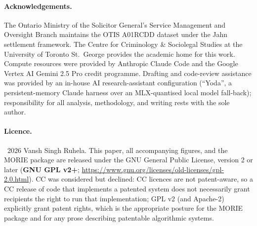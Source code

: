 \documentclass[11pt,a4paper]{article}
\newcommand{\1}{\mathbf{1}}
\theoremstyle{plain}
\theoremstyle{definition}
\begin{document}
\paragraph{Acknowledgements.}
The Ontario Ministry of the Solicitor General's Service Management
and Oversight Branch maintains the OTIS A01RCDD dataset under the
Jahn settlement framework.  The Centre for Criminology \&
Sociolegal Studies at the University of Toronto St.\ George
provides the academic home for this work.  Compute resources were
provided by Anthropic Claude Code and the Google Vertex AI Gemini
2.5 Pro credit programme.  Drafting and code-review assistance
was provided by an in-house AI research-assistant configuration
(``Yoda'', a persistent-memory Claude harness over an MLX-quantised
local model fall-back); responsibility for all analysis,
methodology, and writing rests with the sole author.

\paragraph{Licence.}
\textcopyright\ 2026 Vansh Singh Ruhela.  This paper, all
accompanying figures, and the MORIE package are released under
the GNU General Public License, version 2 or later (\textbf{GNU GPL v2+}; \url{https://www.gnu.org/licenses/old-licenses/gpl-2.0.html}).  CC was considered but declined: CC licences are not patent-aware, so a CC release of code that implements a patented system does not necessarily grant recipients the right to run that implementation; GPL v2 (and Apache-2) explicitly grant patent rights, which is the appropriate posture for the MORIE package and for any prose describing patentable algorithmic systems.
\end{document}

